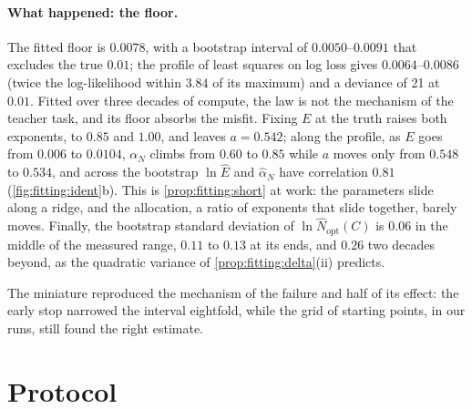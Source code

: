 \begin{refsection}
\paragraph{What happened: the floor.} The fitted floor is $0.0078$, with a bootstrap interval of $0.0050$--$0.0091$ that excludes the true $0.01$; the profile of least squares on log loss gives $0.0064$--$0.0086$ (twice the log-likelihood within $3.84$ of its maximum) and a deviance of 21 at $0.01$. Fitted over three decades of compute, the law is not the mechanism of the teacher task, and its floor absorbs the misfit. Fixing $E$ at the truth raises both exponents, to $0.85$ and $1.00$, and leaves $a=0.542$; along the profile, as $E$ goes from $0.006$ to $0.0104$, $\alpha_N$ climbs from $0.60$ to $0.85$ while $a$ moves only from $0.548$ to $0.534$, and across the bootstrap $\ln\hat E$ and $\hat\alpha_N$ have correlation $0.81$ (\cref{fig:fitting:ident}b). This is \cref{prop:fitting:short} at work: the parameters slide along a ridge, and the allocation, a ratio of exponents that slide together, barely moves. Finally, the bootstrap standard deviation of $\ln\hat N_{\mathrm{opt}}(C)$ is $0.06$ in the middle of the measured range, $0.11$ to $0.13$ at its ends, and $0.26$ two decades beyond, as the quadratic variance of \cref{prop:fitting:delta}(ii) predicts.

The miniature reproduced the mechanism of the failure and half of its effect: the early stop narrowed the interval eightfold, while the grid of starting points, in our runs, still found the right estimate.

\section{Protocol}\label{sec:fitting:protocol}


\end{refsection}
